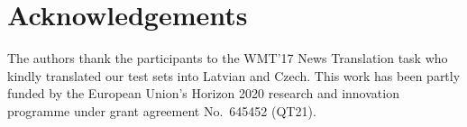 \documentclass[11pt,letterpaper,final,nohyperref]{article}
\begin{document}
\section*{Acknowledgements}
The authors thank the participants to the WMT'17 News Translation task who kindly translated our test sets into Latvian and Czech.
This work has been partly funded by the European Union’s
Horizon 2020 research and innovation programme under grant
agreement No.~645452 (QT21).







\end{document}
